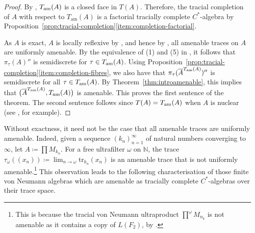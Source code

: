 \documentclass[a4paper,11pt]{amsart}
\theoremstyle{definition}
\numberwithin{equation}{section}
\numberwithin{theorem}{section}
\newcommand{\completion}[2]{\overline{#1}^{#2}}
\begin{document}
\begin{proof}
	By \cite[Lemma~3.4]{Kirchberg94}, $T_{\rm am}(A)$ is a closed face in $T(A)$.  Therefore, the tracial completion of $A$ with respect to $T_{\mathrm{am}}(A)$ is a factorial tracially complete $C^*$-algebra by Proposition~\ref{prop:tracial-completion}\ref{item:completion-factorial}.  
	
	
	As $A$ is exact, $A$ is locally reflexive by \cite[Remark~(11)]{Kirchberg95}, and hence by \cite[Theorem~4.3.3]{Bro06}, all amenable traces on $A$ are uniformly amenable.  By the equivalence of (1) and (5) in \cite[Theorem~3.2.2]{Bro06}, it follows that $\pi_\tau(A)''$ is semidiscrete for $\tau \in T_{\rm am}(A)$.  Using Proposition~\ref{prop:tracial-completion}\ref{item:completion-fibres}, we also have that $\pi_\tau(\completion{A}{T_{\rm am}(A)})''$ is semidiscrete for all $\tau \in T_{\rm am}(A)$.
    By Theorem~\ref{thm:introamenable}, this implies that $\big(\completion{A}{T_{\rm am}(A)},T_{\rm am}(A)\big)$ is {}amenable.
    This proves the first sentence of the theorem.  The second sentence follows since $T(A) = T_{\rm am}(A)$ when $A$ is nuclear (see \cite[Theorem~4.2.1]{Bro06}, for example).
\end{proof}

Without exactness, it need not be the case that all amenable traces are uniformly amenable. Indeed, given a sequence $(k_n)_{n=1}^\infty$ of natural numbers converging to $\infty$, let $A\coloneqq \prod M_{k_n}$.  For a free ultrafilter $\omega$ on $\mathbb N$, the trace $\tau_\omega((x_n))\coloneqq \lim_{n\to\omega}\mathrm{tr}_{k_n}(x_n)$ is an amenable trace that is not uniformly amenable.\footnote{This is because the tracial von Neumann ultraproduct $\prod^\omega M_{n_k}$ is not amenable as it contains a copy of $L(F_2)$, by \cite[Theorem~3.8]{Voi91}.\label{fn:NonAmenableUltraprod}} This observation leads to the following characterisation of those finite von Neumann algebras which are {}amenable as tracially complete $C^*$-algebras over their trace space.
\end{document}
